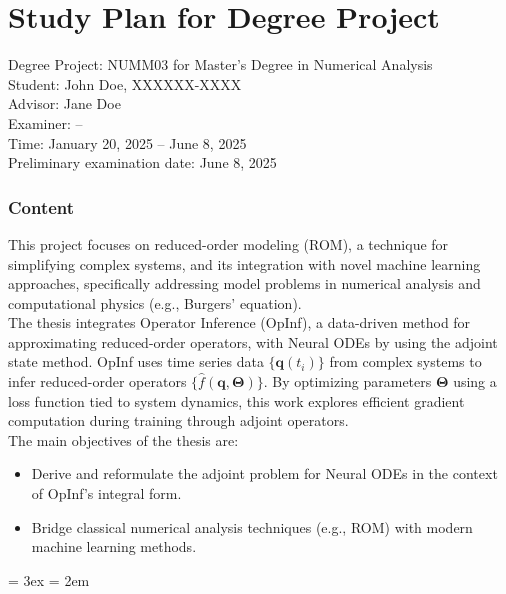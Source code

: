 \documentclass[en,cm,10pt]{inst}
\begin{document}
	\section*{Study Plan for Degree Project}
	Degree Project: NUMM03 for Master's Degree in Numerical Analysis \\
	Student: John Doe, XXXXXX-XXXX\\
	Advisor: Jane Doe\\
	Examiner: --\\ 
	Time:  January 20, 2025 -- June 8, 2025\\
    Preliminary examination date: June 8, 2025
	
	\subsubsection*{Content}
	This project focuses on reduced-order modeling (ROM), a technique for simplifying complex systems, and its integration with novel machine learning approaches, specifically addressing model problems in numerical analysis and computational physics (e.g., Burgers' equation).\\
    
    \noindent The thesis integrates Operator Inference (OpInf), a data-driven method for approximating reduced-order operators, with Neural ODEs by using the adjoint state method. OpInf uses time series data $\{\mathbf{q}(t_i)\}$ from complex systems to infer reduced-order operators $\{\hat{f}(\mathbf{q}, \bm{\Theta})\}$. By optimizing parameters $\bm{\Theta}$ using a loss function tied to system dynamics, this work explores efficient gradient computation during training through adjoint operators.\\

    The main objectives of the thesis are:
    \begin{itemize}
        \item Derive and reformulate the adjoint problem for Neural ODEs in the context of OpInf's integral form.
        \item Bridge classical numerical analysis techniques (e.g., ROM) with modern machine learning methods.
    \end{itemize}
	
	
	\bibitemsep = 3ex
	\bibhang = 2em
	
	\nocite{*} %
	
	\printbibliography[heading=bibintoc,title=\normalsize Literature]
	
\end{document}
